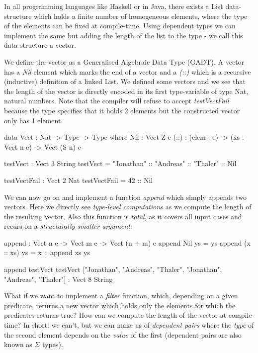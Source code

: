 In all programming languages like Haskell or in Java, there exists a List data-structure which holds a finite number of homogeneous elements, where the type of the elements can be fixed at compile-time. Using dependent types we can implement the same but adding the length of the list to the type - we call this data-structure a vector.

We define the vector as a Generalised Algebraic Data Type (GADT). A vector has a \textit{Nil} element which marks the end of a vector and a \textit{(::)} which is a recursive (inductive) definition of a linked List. We defined some vectors and we see that the length of the vector is directly encoded in its first type-variable of type Nat, natural numbers. Note that the compiler will refuse to accept \textit{testVectFail} because the type specifies that it holds 2 elements but the constructed vector only has 1 element.

\begin{HaskellCode}
data Vect : Nat -> Type -> Type where
     Nil  : Vect Z e
     (::) : (elem : e) -> (xs : Vect n e) -> Vect (S n) e
	
testVect : Vect 3 String
testVect = "Jonathan" :: "Andreas" :: "Thaler" :: Nil

testVectFail : Vect 2 Nat
testVectFail = 42 :: Nil
\end{HaskellCode}

We can now go on and implement a function \textit{append} which simply appends two vectors. Here we directly see \textit{type-level computations} as we compute the length of the resulting vector. Also this function is \textit{total}, as it covers all input cases and recurs on a \textit{structurally smaller argument}:

\begin{HaskellCode}
append : Vect n e -> Vect m e -> Vect (n + m) e
append Nil ys = ys
append (x :: xs) ys = x :: append xs ys

append testVect testVect
["Jonathan", "Andreas", "Thaler", "Jonathan", "Andreas", "Thaler"] : Vect 8 String
\end{HaskellCode}

What if we want to implement a \textit{filter} function, which, depending on a given predicate, returns a new vector which holds only the elements for which the predicates returns true? How can we compute the length of the vector at compile-time? In short: we can't, but we can make us of \textit{dependent pairs} where the \textit{type} of the second element depends on the \textit{value} of the first (dependent pairs are also known as $\Sigma$ types).

